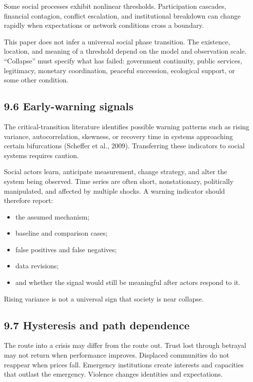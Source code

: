 \documentclass[
  11pt,
]{article}
\providecommand{\tightlist}{%
  \setlength{\itemsep}{0pt}\setlength{\parskip}{0pt}}
\begin{document}
Some social processes exhibit nonlinear thresholds. Participation
cascades, financial contagion, conflict escalation, and institutional
breakdown can change rapidly when expectations or network conditions
cross a boundary.

This paper does not infer a universal social phase transition. The
existence, location, and meaning of a threshold depend on the model and
observation scale. ``Collapse'' must specify what has failed: government
continuity, public services, legitimacy, monetary coordination, peaceful
succession, ecological support, or some other condition.

\subsection{9.6 Early-warning signals}\label{early-warning-signals}

The critical-transition literature identifies possible warning patterns
such as rising variance, autocorrelation, skewness, or recovery time in
systems approaching certain bifurcations (Scheffer et al., 2009).
Transferring these indicators to social systems requires caution.

Social actors learn, anticipate measurement, change strategy, and alter
the system being observed. Time series are often short, nonstationary,
politically manipulated, and affected by multiple shocks. A warning
indicator should therefore report:

\begin{itemize}
\tightlist
\item
  the assumed mechanism;
\item
  baseline and comparison cases;
\item
  false positives and false negatives;
\item
  data revisions;
\item
  and whether the signal would still be meaningful after actors respond
  to it.
\end{itemize}

Rising variance is not a universal sign that society is near collapse.

\subsection{9.7 Hysteresis and path
dependence}\label{hysteresis-and-path-dependence}

The route into a crisis may differ from the route out. Trust lost
through betrayal may not return when performance improves. Displaced
communities do not reappear when prices fall. Emergency institutions
create interests and capacities that outlast the emergency. Violence
changes identities and expectations.
\end{document}
